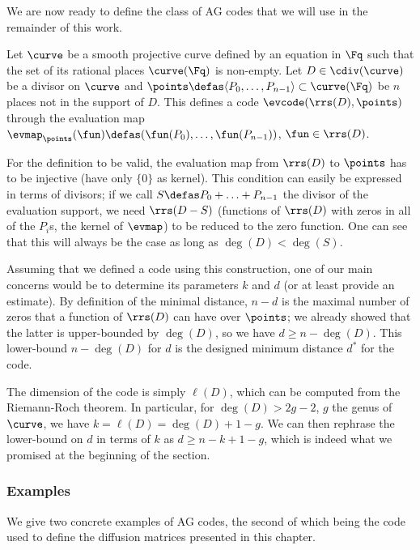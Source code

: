 We are now ready to define the class of AG codes that we will use in the remainder of this work.

Let $\curve$ be a smooth projective curve defined by an equation in $\Fq$ such that the set of its rational places $\curve(\Fq)$ is non-empty.
Let $D \in \cdiv(\curve)$ be a divisor on $\curve$ and $\points \defas \langle P_0, \ldots, P_{n-1}\rangle \subset \curve(\Fq)$ be $n$ places not in the support of $D$.
This defines a code $\evcode(\rrs(D), \points)$ through the evaluation map $\evmap_\points(\fun) \defas (\fun(P_0),\ldots,\fun(P_{n-1}))$, $\fun \in \rrs(D)$.

For the definition to be valid, the evaluation map from $\rrs(D)$ to $\points$ has to be injective (\ie have only $\{0\}$ as kernel).
This condition can easily be expressed in terms of divisors; if we call $S \defas P_0 + \ldots + P_{n-1}$ the divisor of the
evaluation support, we need $\rrs(D - S)$ (\ie functions of $\rrs(D)$ with zeros in all of the $P_i$s, \ie the kernel of $\evmap$) to be reduced to the zero function.
One can see that this will always be the case as long as $\deg(D) < \deg(S)$.

\medskip

Assuming that we defined a code using this construction, one of our main concerns would be to determine its parameters $k$ and $d$ (or at least provide an estimate).
By definition of the minimal distance, $n - d$ is the maximal number of zeros that a function of $\rrs(D)$ can have
over $\points$; we already showed that the latter is upper-bounded by $\deg(D)$, so we have $d \geq n - \deg(D)$. This lower-bound
$n - \deg(D)$ for $d$ is the designed minimum distance $d^*$ for the code.

The dimension of the code is simply $\ell(D)$, which can be computed from the Riemann-Roch theorem. In particular, for $\deg(D) > 2g -2$, $g$ the genus of
$\curve$, we have $k = \ell(D) = \deg(D) + 1 - g$. We can then rephrase the lower-bound on $d$ in terms of $k$ as $d \geq n - k + 1 - g$, which is indeed
what we promised at the beginning of the section.

\subsubsection{Examples}

We give two concrete examples of AG codes, the second of which being the code used to define the diffusion matrices presented in this chapter.


